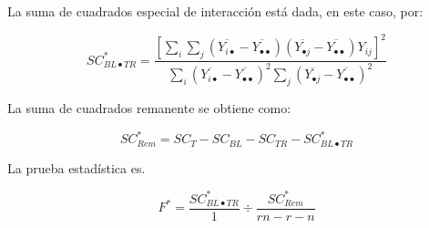 \documentclass[]{book}
\theoremstyle{definition}
\theoremstyle{definition}
\theoremstyle{definition}
\theoremstyle{remark}
\begin{document}
La suma de cuadrados especial de interacción está dada, en este caso,
por:

\[
SC_{BL \bullet TR}^{*} = \frac{\left\lbrack \sum_{i}^{}{\sum_{j}^{}{\left(  \overline{Y_{i \bullet}} -  \overline{Y_{\bullet \bullet}} \right)\left(  \overline{Y_{\bullet j}} -  \overline{Y_{\bullet \bullet}} \right)Y_{ij}}} \right\rbrack^{2}}{{\sum_{i}^{}\left(  \overline{Y_{i \bullet}} -  \overline{Y_{\bullet \bullet}} \right)}^{2}\sum_{j}^{}\left(  \overline{Y_{\bullet j}} -  \overline{Y_{\bullet \bullet}} \right)^{2}}
\]

La suma de cuadrados remanente se obtiene como:

\[
SC_{Rem}^{*} = SC_{T}-SC_{BL}-SC_{TR}-SC_{BL \bullet TR}^{*}
\]

La prueba estadística es.

\[
F^{*} = \frac{SC_{BL\bullet TR}^{*}}{1} \div \frac{SC_{Rem}^{*}}{rn - r - n}
\]
\end{document}
